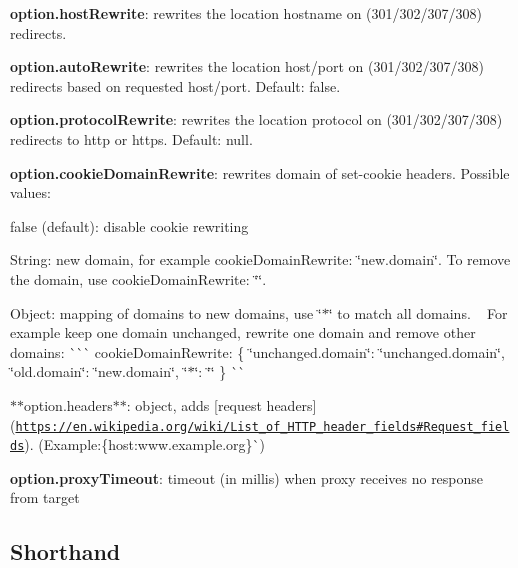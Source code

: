 \begin{DoxyItemize}
\item {\bfseries option.\+host\+Rewrite}\+: rewrites the location hostname on (301/302/307/308) redirects.
\item {\bfseries option.\+auto\+Rewrite}\+: rewrites the location host/port on (301/302/307/308) redirects based on requested host/port. Default\+: false.
\item {\bfseries option.\+protocol\+Rewrite}\+: rewrites the location protocol on (301/302/307/308) redirects to \textquotesingle{}http\textquotesingle{} or \textquotesingle{}https\textquotesingle{}. Default\+: null.
\item {\bfseries option.\+cookie\+Domain\+Rewrite}\+: rewrites domain of {\ttfamily set-\/cookie} headers. Possible values\+:
\begin{DoxyItemize}
\item {\ttfamily false} (default)\+: disable cookie rewriting
\item String\+: new domain, for example {\ttfamily cookie\+Domain\+Rewrite\+: \char`\"{}new.\+domain\char`\"{}}. To remove the domain, use {\ttfamily cookie\+Domain\+Rewrite\+: \char`\"{}\char`\"{}}.
\item Object\+: mapping of domains to new domains, use {\ttfamily \char`\"{}$\ast$\char`\"{}} to match all domains. ~\newline
 For example keep one domain unchanged, rewrite one domain and remove other domains\+: \`{}\`{}\`{} cookie\+Domain\+Rewrite\+: \{ \char`\"{}unchanged.\+domain\char`\"{}\+: \char`\"{}unchanged.\+domain\char`\"{}, \char`\"{}old.\+domain\char`\"{}\+: \char`\"{}new.\+domain\char`\"{}, \char`\"{}$\ast$\char`\"{}\+: \char`\"{}\char`\"{} \} \`{}\`{}{\ttfamily }
\end{DoxyItemize}
\item {\ttfamily  $\ast$$\ast$option.headers$\ast$$\ast$\+: object, adds \mbox{[}request headers\mbox{]}(\href{https://en.wikipedia.org/wiki/List_of_HTTP_header_fields#Request_fields}{\tt https\+://en.\+wikipedia.\+org/wiki/\+List\+\_\+of\+\_\+\+H\+T\+T\+P\+\_\+header\+\_\+fields\#\+Request\+\_\+fields}). (Example\+:}\{host\+:\textquotesingle{}www.\+example.\+org\textquotesingle{}\}\`{})
\item {\bfseries option.\+proxy\+Timeout}\+: timeout (in millis) when proxy receives no response from target
\end{DoxyItemize}

\subsection*{Shorthand}

